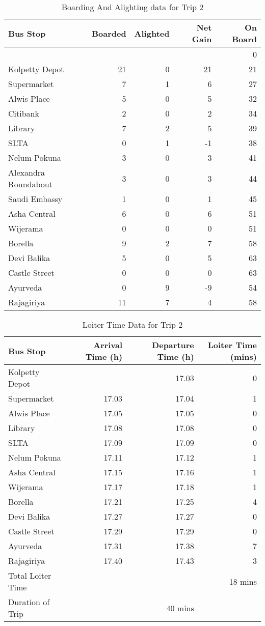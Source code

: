 
\begin{table}
\centering
\begin{tabular}{|l|r|r|r|r|}
\hline
Bus Stop & Boarded & Alighted & Net Gain & On Board \\
\hline
 & & & & 0 \\
Kolpetty Depot	&21	&0	&21	&21\\
Supermarket	&7	&1	&6	&27\\
Alwis Place	&5	&0	&5	&32\\
\rowcolor[gray]{0.7}
Citibank	&2	&0	&2	&34\\
Library	&7	&2	&5	&39\\
SLTA	&0	&1	&-1	&38\\
Nelum Pokuna	&3	&0	&3	&41\\
\rowcolor[gray]{0.7}
Alexandra Roundabout	&3	&0	&3	&44\\
\rowcolor[gray]{0.7}
Saudi Embassy	&1	&0	&1	&45\\
Asha Central	&6	&0	&6	&51\\
Wijerama	&0	&0	&0	&51\\
Borella	&9	&2	&7	&58\\
Devi Balika	&5	&0	&5	&63\\
Castle Street	&0	&0	&0	&63\\
Ayurveda	&0	&9	&-9	&54\\
Rajagiriya	&11	&7	&4	&58\\
\hline
\end{tabular}
\caption{Boarding And Alighting data for Trip 2}
\label{table-trip2-BoardingAndAlighting}
\end{table}

\begin{table}
\centering
\begin{tabular}{|l|r|r|r|}
\hline
Bus Stop & Arrival Time (h) & Departure Time (h) & Loiter Time (mins) \\
\hline
Kolpetty Depot	&	&17.03	&0\\
Supermarket	&17.03	&17.04	&1\\
Alwis Place	&17.05	&17.05	&0\\
Library	&17.08	&17.08	&0\\
SLTA	&17.09	&17.09	&0\\
Nelum Pokuna	&17.11	&17.12	&1\\
Asha Central	&17.15	&17.16	&1\\
Wijerama	&17.17	&17.18	&1\\
Borella	&17.21	&17.25	&4\\
Devi Balika	&17.27	&17.27	&0\\
Castle Street	&17.29	&17.29	&0\\
Ayurveda	&17.31	&17.38	&7\\
Rajagiriya	&17.40	&17.43	&3\\
\hline
Total Loiter Time & & & 18 mins \\
Duration of Trip & & 40 mins & \\
\hline
\end{tabular}
\caption{Loiter Time Data for Trip 2}
\label{table-trip2-LoiterTime}
\end{table}

